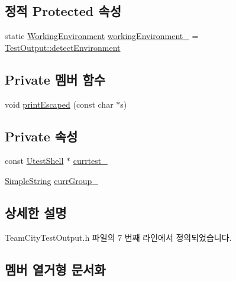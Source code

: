 \subsection*{정적 Protected 속성}
\begin{DoxyCompactItemize}
\item 
static \hyperlink{class_test_output_a0541851f863713454486a9fb3080f766}{Working\+Environment} \hyperlink{class_test_output_a8b622cfce4b95599cd31b61a777d68ef}{working\+Environment\+\_\+} = \hyperlink{class_test_output_a0541851f863713454486a9fb3080f766a3f11f791db94db142e33c3c75442ed10}{Test\+Output\+::detect\+Environment}
\end{DoxyCompactItemize}
\subsection*{Private 멤버 함수}
\begin{DoxyCompactItemize}
\item 
void \hyperlink{class_team_city_test_output_a172e95876c8993ddb5cbf83b47a82261}{print\+Escaped} (const char $\ast$s)
\end{DoxyCompactItemize}
\subsection*{Private 속성}
\begin{DoxyCompactItemize}
\item 
const \hyperlink{class_utest_shell}{Utest\+Shell} $\ast$ \hyperlink{class_team_city_test_output_a5dc621283d75466dfdb5169ca66eb571}{currtest\+\_\+}
\item 
\hyperlink{class_simple_string}{Simple\+String} \hyperlink{class_team_city_test_output_a9dc3c1a55caf7bc0e5b4b28d686e866f}{curr\+Group\+\_\+}
\end{DoxyCompactItemize}


\subsection{상세한 설명}


Team\+City\+Test\+Output.\+h 파일의 7 번째 라인에서 정의되었습니다.



\subsection{멤버 열거형 문서화}
